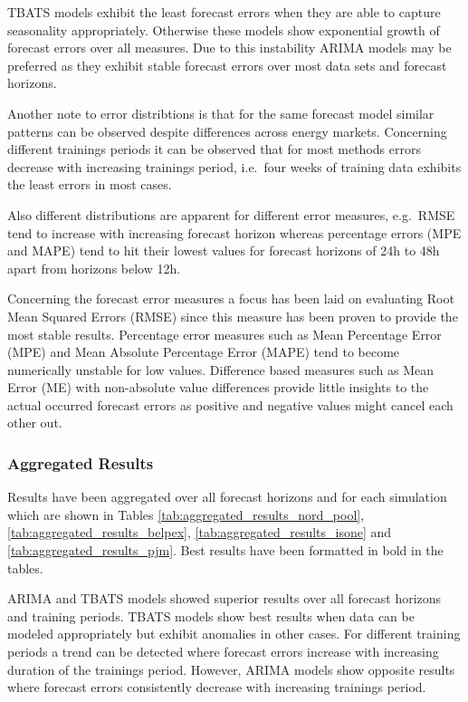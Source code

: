 TBATS models exhibit the least forecast errors when they are able to capture seasonality appropriately. Otherwise these models show exponential growth of forecast errors over all measures. Due to this instability ARIMA models may be preferred as they exhibit stable forecast errors over most data sets and forecast horizons. 

Another note to error distribtions is that for the same forecast model similar patterns can be observed despite differences across energy markets. Concerning different trainings periods it can be observed that for most methods errors decrease with increasing trainings period, i.e.~four weeks of training data exhibits the least errors in most cases. 

Also different distributions are apparent for different error measures, e.g.~RMSE tend to increase with increasing forecast horizon whereas percentage errors (MPE and MAPE) tend to hit their lowest values for forecast horizons of 24h to 48h apart from horizons below 12h. 

Concerning the forecast error measures a focus has been laid on evaluating Root Mean Squared Errors (RMSE) since this measure has been proven to provide the most stable results. Percentage error measures such as Mean Percentage Error (MPE) and Mean Absolute Percentage Error (MAPE) tend to become numerically unstable for low values. Difference based measures such as Mean Error (ME) with non-absolute value differences provide little insights to the actual occurred forecast errors as positive and negative values might cancel each other out. 



\subsubsection{Aggregated Results}

Results have been aggregated over all forecast horizons and for each simulation which are shown in Tables \ref{tab:aggregated_results_nord_pool}, \ref{tab:aggregated_results_belpex}, \ref{tab:aggregated_results_isone} and \ref{tab:aggregated_results_pjm}. Best results have been formatted in bold in the tables. 

ARIMA and TBATS models showed superior results over all forecast horizons and training periods. TBATS models show best results when data can be modeled appropriately but exhibit anomalies in other cases. For different training periods a trend can be detected where forecast errors increase with increasing duration of the trainings period. However, ARIMA models show opposite results where forecast errors consistently decrease with increasing trainings period. 


